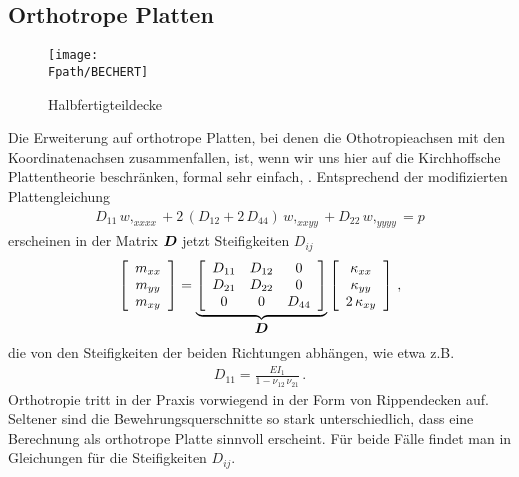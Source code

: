 {\textcolor{sectionTitleBlue}{\subsection{Orthotrope Platten}}}
\begin{figure}[tbp]
\centering
\if {} \sidecaption \fi
\texttt{[image: \\Fpath/BECHERT]}
\caption{Halbfertigteildecke} \label{Bechert}
\end{figure}%
Die Erweiterung auf orthotrope Platten, bei denen die Othotropieachsen mit den Koordinatenachsen zusammenfallen, ist, wenn wir uns hier auf die Kirchhoffsche Plattentheorie beschr\"{a}nken, formal sehr einfach, \cite{Altenbach}. Entsprechend der modifizierten Plattengleichung
\begin{align}
D_{11}\,w,_{xxxx} + 2\,(D_{12} + 2\,D_{44})\,w,_{xxyy} + D_{22}\,w,_{yyyy} = p
\end{align}
erscheinen in der Matrix $\vek D$ jetzt Steifigkeiten $D_{ij}$
\begin{align}
\left[\barr {c} m_{xx} \\  m_{yy} \\  m_{xy} \earr\right] = \underbrace{\left [\barr {c
c c}
D_{11} & D_{12} & 0 \\
D_{21} & D_{22} & 0 \\ 0 & 0 & D_{44} \earr \right]}_{\vek D} \left[\barr {c} \kappa_{xx} \\
\kappa_{yy} \\  2\,\kappa_{xy} \earr\right] \,,
\end{align}
die von den Steifigkeiten der beiden Richtungen abh\"{a}ngen, wie etwa z.B.
\begin{align}
D_{11} = \frac{EI_1}{1 - \nu_{12}\,\nu_{21}}\,.
\end{align}
Orthotropie tritt in der Praxis vorwiegend in der Form von Rippendecken auf. Seltener sind die Bewehrungsquerschnitte so stark unterschiedlich, dass eine Berechnung als orthotrope Platte sinnvoll erscheint. F\"{u}r beide F\"{a}lle findet man in \cite{Altenbach} Gleichungen f\"{u}r die Steifigkeiten $D_{ij}$.

